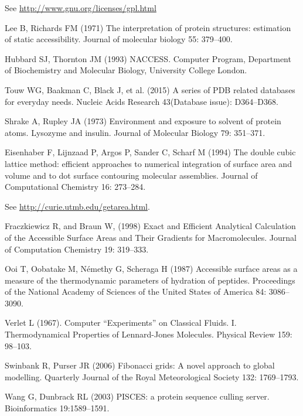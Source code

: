 \documentclass[a4paper,11pt]{article}
\begin{document}
\begin{small}
  
\begin{thebibliography}{50}

  See  \url{http://www.gnu.org/licenses/gpl.html}

  Lee B, Richards FM (1971) The interpretation of protein
  structures: estimation of static accessibility. Journal of molecular
  biology 55: 379--400.

  Hubbard SJ, Thornton JM (1993) NACCESS. Computer Program,
  Department of Biochemistry and Molecular Biology, University College
  London.

  Touw WG, Baakman C, Black J, et al. (2015)
  A series of PDB related databases for everyday needs.
  Nucleic Acids Research 43(Database issue): D364--D368.

  Shrake A, Rupley JA (1973) Environment and exposure to
  solvent of protein atoms. Lysozyme and insulin. Journal of Molecular
  Biology 79: 351--371.

  Eisenhaber F, Lijnzaad P, Argos P, Sander C, Scharf M (1994)
  The double cubic lattice method: efficient approaches to numerical
  integration of surface area and volume and to dot surface contouring
  molecular assemblies. Journal of Computational Chemistry 16: 273--284.

  See \url{http://curie.utmb.edu/getarea.html}.

  Fraczkiewicz R, and Braun W, (1998) Exact and Efficient Analytical
  Calculation of the Accessible Surface Areas and Their Gradients for
  Macromolecules. Journal of Computation Chemistry 19: 319--333.

  Ooi T, Oobatake M, Némethy G, Scheraga H (1987)
  Accessible surface areas as a measure of the thermodynamic
  parameters of hydration of peptides. Proceedings of the National
  Academy of Sciences of the United States of America 84: 3086--3090.

  Verlet L (1967). Computer ``Experiments'' on Classical
  Fluids. I. Thermodynamical Properties of Lennard-Jones
  Molecules. Physical Review 159: 98--103.

  Swinbank R, Purser JR (2006) Fibonacci grids: A novel approach to
  global modelling. Quarterly Journal of the Royal Meteorological
  Society 132: 1769--1793.

  Wang G, Dunbrack RL (2003) PISCES: a protein sequence culling server. 
  Bioinformatics 19:1589--1591.


\end{thebibliography}
\end{small}
\end{document}
